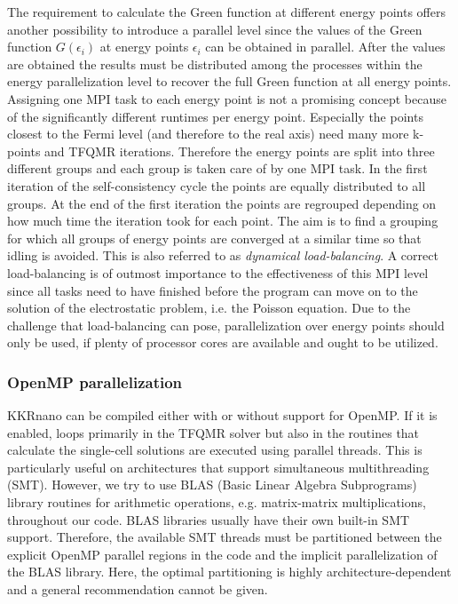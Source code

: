 \documentclass [a4paper, 12pt]{article}
\begin{document}
The requirement to calculate the Green function at different energy points offers another possibility to
introduce a parallel level since the values of the Green function $G(\epsilon_i)$ at energy points $\epsilon_i$
can be obtained in parallel.
After the values are obtained the results must be distributed among the processes within
the energy parallelization level to recover the full Green function at all energy points.
\\
Assigning one MPI task to each energy point is not a promising concept because
of the significantly different runtimes per energy point. Especially the points closest to the
Fermi level (and therefore to the real axis)
need many more k-points and TFQMR iterations.
Therefore the energy points are split into three different groups and each group is taken care of by
one MPI task. In the first iteration of the self-consistency cycle the points are equally distributed to all
groups. At the end of the first iteration the points are regrouped depending on how much time the iteration took
for each point. The aim is to find a grouping for which all groups of energy points are converged at
a similar time so that idling is avoided. This is also referred to as \textit{dynamical load-balancing}.
A correct load-balancing is of outmost importance to the effectiveness of this MPI level since
all tasks need to have finished before the program can move on to the solution of the electrostatic problem,
i.e. the Poisson equation.
Due to the challenge that load-balancing can pose, parallelization over energy points should only be used, 
if plenty of processor cores are available and
ought to be utilized.

\subsubsection*{OpenMP parallelization}

KKRnano can be compiled either with or without support for OpenMP. If it is enabled,
loops primarily in the TFQMR solver but also in the routines that calculate the single-cell
solutions are executed using parallel threads. 
This is particularly useful on architectures that support simultaneous multithreading (SMT).
However, we try to use BLAS (Basic Linear Algebra Subprograms) library routines for arithmetic
operations, e.g. matrix-matrix multiplications, throughout our code. BLAS libraries usually
have their own built-in SMT support.
Therefore, the available SMT threads must be partitioned between the explicit OpenMP 
parallel regions in the code and the implicit parallelization of the BLAS library.
Here, the optimal partitioning is highly architecture-dependent and a general recommendation cannot
be given.
\end{document}
